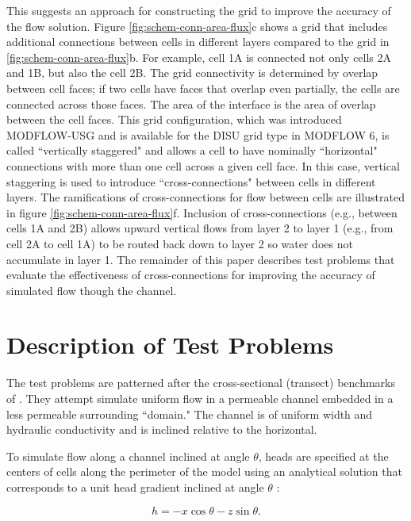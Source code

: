 \documentclass{article}
\begin{document}
This suggests an approach for constructing the grid to improve the accuracy of the flow solution. Figure \ref{fig:schem-conn-area-flux}c shows a grid that includes additional connections between cells in different layers compared to the grid in \ref{fig:schem-conn-area-flux}b. For example, cell 1A is connected not only cells 2A and 1B, but also the cell 2B. The grid connectivity is determined by overlap between cell faces; if two cells have faces that overlap even partially, the cells are connected across those faces. The area of the interface is the area of overlap between the cell faces. This grid configuration, which was introduced MODFLOW-USG \citep{modflowusg} and is available for the DISU grid type in MODFLOW 6, is called ``vertically staggered" and allows a cell to have nominally ``horizontal" connections with more than one cell across a given cell face. In this case, vertical staggering is used to introduce ``cross-connections" between cells in different layers. The ramifications of cross-connections for flow between cells are illustrated in figure \ref{fig:schem-conn-area-flux}f. Inclusion of cross-connections (e.g., between cells 1A and 2B) allows upward vertical flows from layer 2 to layer 1 (e.g., from cell 2A to cell 1A) to be routed back down to layer 2 so water does not accumulate in layer 1. The remainder of this paper describes test problems that evaluate the effectiveness of cross-connections for improving the accuracy of simulated flow though the channel.

\section{Description of Test Problems}

The test problems are patterned after the cross-sectional (transect) benchmarks of \cite{bardot2022}. They attempt simulate uniform flow in a permeable channel embedded in a less permeable surrounding ``domain." The channel is of uniform width and hydraulic conductivity and is inclined relative to the horizontal.

To simulate flow along a channel inclined at angle $\theta$, heads are specified at the centers of cells along the perimeter of the model using an analytical solution that corresponds to a unit head gradient inclined at angle $\theta$ \citep{bardot2022}:

\begin{equation}
\label{eqn:head_analyt_along}
h = - x \cos \theta - z \sin \theta.
\end{equation}
\end{document}
